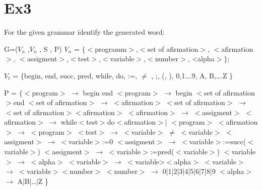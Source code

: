 \documentclass[12pt]{article}
\begin{document}
\newpage





\section*{Ex3}
For the given grammar identify the generated word:
\begin{center}
    G=($V_n$ ,$V_n$ , S , P)
    $V_n$ = $\{<$programm$>$,$<$set of afirmation$>$, $<$afirmation$>$,
    $<$assigment$>$,$<$test$>$,$<$variable$>$,$<$number$>$, <alpha$>\};$

    $ V_t$ = $\{$begin, end, succ, pred, while, do, :=, $\neq$ , ;, (, ), 0,1….9, A, B,….Z $\}$

    P = $\{$$<$program$>$ $\to$  begin end \newline
        $<$program$>$ $\to$  begin $<$set of afirmation$>$end \newline
        $<$set of afirmation$>$ $\to$ $<$afirmation$>$ \newline
        $<$set of afirmation$>$ $\to$ $<$set of afirmation$>$$<$afirmation$>$ \newline
    $<$afirmation$>$ $\to$ $<$assigment$>$ \newline
    $<$afirmation$>$ $\to$ while$<$test$>$do$<$afirmation$>$| $<$program$>$ \newline
    $<$afirmation$>$ $\to$  $<$program$>$ \newline
    $<$test$>$ $\to$ $<$variable$>$ $\neq$ $<$variable$>$ \newline
    $<$assigment$>$ $\to$ $<$variable$>$:=0 \newline
    $<$assigment$>$ $\to$ $<$variable$>$:=succ($<$variable$>$) \newline
    $<$assigment$>$ $\to$ $<$variable$>$:=pred($<$variable$>$) \newline
    $<$variable$>$ $\to$ $<$alpha$>$ \newline
    $<$variable$>$ $\to$ $<$variable>$<$alpha$>$ \newline
    $<$variable$>$ $\to$ $<$variable$>$$<$number$>$ \newline
    $<$number$>$ $\to$ 0|1|2|3|4|5|6|7|8|9 \newline
    $<$alpha$>$ $\to$ A|B|…|Z \}
\end{center}
\end{document}

